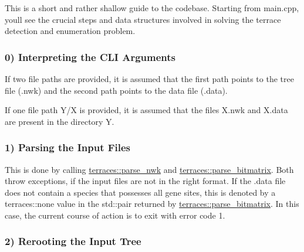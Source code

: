 This is a short and rather shallow guide to the codebase. Starting from main.\+cpp, you\textquotesingle{}ll see the crucial steps and data structures involved in solving the terrace detection and enumeration problem.

\subsubsection*{0) Interpreting the C\+LI Arguments}

If two file paths are provided, it is assumed that the first path points to the tree file (.nwk) and the second path points to the data file (.data).

If one file path Y/X is provided, it is assumed that the files X.\+nwk and X.\+data are present in the directory Y.

\subsubsection*{1) Parsing the Input Files}

This is done by calling \hyperlink{namespaceterraces_add61915a31828774ee0371d443031c29}{terraces\+::parse\+\_\+nwk} and \hyperlink{namespaceterraces_af52559863b67502f00d68853f50c69af}{terraces\+::parse\+\_\+bitmatrix}. Both throw exceptions, if the input files are not in the right format. If the .data file does not contain a species that possesses all gene sites, this is denoted by a terraces\+::none value in the std\+::pair returned by \hyperlink{namespaceterraces_af52559863b67502f00d68853f50c69af}{terraces\+::parse\+\_\+bitmatrix}. In this case, the current course of action is to exit with error code 1.

\subsubsection*{2) Rerooting the Input Tree}